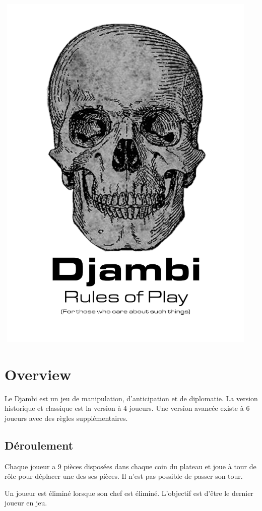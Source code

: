 \documentclass{article}
\begin{document}
\includegraphics[width=5in,height=7in]{media/image1.png}
\newpage


\section{Overview}
Le Djambi est un jeu de manipulation, d'anticipation et de diplomatie.
La version historique et classique est la version à 4 joueurs.
Une version avancée existe à 6 joueurs avec des règles supplémentaires.


\subsection{Déroulement}
Chaque joueur a 9 pièces disposées dans chaque coin du plateau et joue à tour de rôle pour déplacer une des ses pièces.
Il n'est pas possible de passer son tour.

Un joueur est éliminé lorsque son chef est éliminé.
L'objectif est d'être le dernier joueur en jeu.
\vspace{40pt} %
\end{document}
